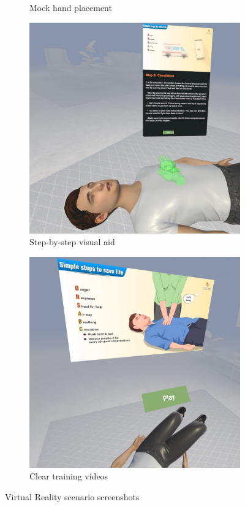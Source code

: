 \documentclass[manuscript]{./Models/acmart}
\begin{document}
\begin{figure}[h]
\begin{subfigure}[b]{0.24\textwidth}
        \caption{Mock hand placement}
        \label{fig:VR2}
    \end{subfigure}
    \hfill
    \begin{subfigure}[b]{0.24\textwidth}
        \centering
        \includegraphics[width=\textwidth]{Photos/VR3.jpeg}
        \caption{Step-by-step visual aid}
        \label{fig:VR3}
    \end{subfigure}
    \hfill
    \begin{subfigure}[b]{0.24\textwidth}
        \centering
        \includegraphics[width=\textwidth]{Photos/VR4.jpeg}
        \caption{Clear training videos}
        \label{fig:VR4}
    \end{subfigure}
    \caption{Virtual Reality scenario screenshots}
    \label{fig:overallVR}    
\end{figure}
\end{document}
